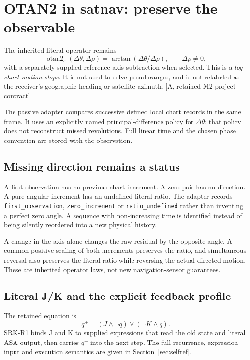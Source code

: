 \documentclass[11pt,a4paper]{article}
\newcommand{\code}[1]{\texttt{#1}}
\newcommand{\base}{\textcolor{muted}{[A, retained M2 project contract]}}
\newcommand{\ot}{\operatorname{otan2}}
\begin{document}
\section{OTAN2 in satnav: preserve the observable}
The inherited literal operator remains
\begin{equation}
\ot_s(\Delta\theta,\Delta\rho)=\arctan(\Delta\theta/\Delta\rho),
\qquad \Delta\rho\ne0,
\end{equation}
with a separately supplied reference-axis subtraction when selected. This is a
\emph{log-chart motion slope}. It is not used to solve pseudoranges, and is not
relabeled as the receiver's geographic heading or satellite azimuth. \base

The passive adapter compares successive defined local chart records in the same
frame. It uses an explicitly named principal-difference policy for $\Delta\theta$;
that policy does not reconstruct missed revolutions. Full linear time and the
chosen phase convention are stored with the observation.

\subsection{Missing direction remains a status}
A first observation has no previous chart increment. A zero pair has no direction.
A pure angular increment has an undefined literal ratio. The adapter records
\code{first\_observation}, \code{zero\_increment} or \code{ratio\_undefined} rather
than inventing a perfect zero angle. A sequence with non-increasing time is identified
instead of being silently reordered into a new physical history.

A change in the axis alone changes the raw residual by the opposite angle. A common
positive scaling of both increments preserves the ratio, and simultaneous reversal
also preserves the literal ratio while reversing the actual directed motion. These
are inherited operator laws, not new navigation-sensor guarantees.

\subsection{Literal J/K and the explicit feedback profile}
The retained equation is
\begin{equation}
q^+=(J\land\neg q)\lor(\neg K\land q).
\end{equation}
SRK-R1 binds J and K to supplied expressions that read the old state and literal
ASA output, then carries $q^+$ into the next step. The full recurrence, expression
input and execution semantics are given in Section~\ref{sec:selfref}.
\end{document}
